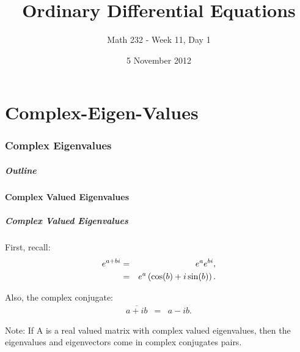 \part{Complex-Eigen-Values}
\section{Complex Eigenvalues}


\title{Ordinary Differential Equations}
\subtitle{Math 232 - Week 11, Day 1}
\date{5 November 2012}

\begin{frame}
  \titlepage
\end{frame}

\begin{frame}
  \frametitle{Outline}
  \tableofcontents[currentsection]
\end{frame}


\subsection{Complex Valued Eigenvalues}


\begin{frame}
  \frametitle{Complex Valued Eigenvalues}

  First, recall:
  \begin{eqnarray*}
    e^{a+bi} & = & e^a e^{bi}, \\
    & = & e^a \left( \cos(b) + i \sin(b) \right).
  \end{eqnarray*}

  Also, the complex conjugate:
  \begin{eqnarray*}
    \overline{a+ib} & = & a-i b.
  \end{eqnarray*}

  Note: If A is a real valued matrix with complex valued eigenvalues,
  then the eigenvalues and eigenvectors come in complex conjugates
  pairs.

\end{frame}

